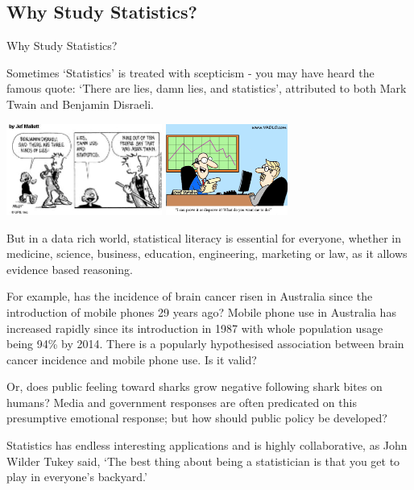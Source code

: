 \documentclass[t,xcolor=pdftex,dvipsnames,table]{beamer}\usepackage[]{graphicx}\usepackage[]{color}
\newcommand{\toclesssection}[1]{
  \setboolean{sectiontoc}{false}
  \setboolean{sectiontoc}{true}
}
\begin{document}

\subsection[]{Why Study Statistics?}
\begin{frame}{Why Study Statistics?}

Sometimes `Statistics' is treated with scepticism - you may have heard the famous quote: `There are lies, damn lies, and statistics', attributed to both Mark Twain and Benjamin Disraeli.  

\vspace{.5cm}
\includegraphics[height=3cm]{../images/StatsLies.jpg} \hspace{1cm} \includegraphics[height=3cm]{../images/StatsDodgy2.jpg}

\vspace{.5cm}
But in a data rich world, statistical literacy is essential for everyone, whether in medicine, science, business, education, engineering, marketing or law, as it allows evidence based reasoning. 
\end{frame}


\begin{frame}{}
For example, has the incidence of brain cancer risen in Australia since the introduction of mobile phones 29 years ago? Mobile phone use in Australia has increased rapidly since its introduction in 1987 with whole population usage being 94\% by 2014. There is a popularly hypothesised association between brain cancer incidence and mobile phone use. Is it valid?

\vspace{.5cm}
Or, does public feeling toward sharks grow negative following shark bites on humans? Media and government responses are often predicated on this presumptive emotional response; but how should public policy be developed?

\vspace{.5cm}
Statistics has endless interesting applications and is highly collaborative, as John Wilder Tukey said, 
`The best thing about being a statistician is that you get to play in everyone's backyard.'
\end{frame}
\end{document}
